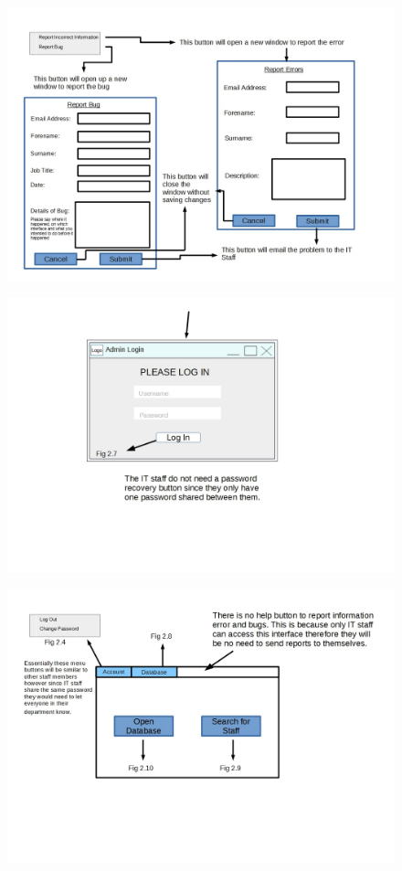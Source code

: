 \begin{figure}[H]
\includegraphics[width=\textwidth]{GUI_Design5.jpg}
\caption{}
\end{figure}

\begin{figure}[H]
\includegraphics[width=\textwidth]{GUI_Design6.jpg}
\caption{}
\end{figure}

\begin{figure}[H]
\includegraphics[width=\textwidth]{GUI_Design7.jpg}
\caption{}
\end{figure}

